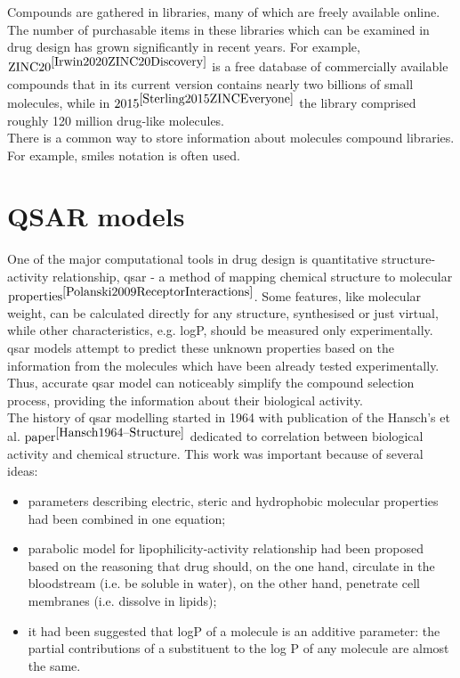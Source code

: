 Compounds are gathered in libraries, many of which are freely available online.
The number of purchasable items in these libraries which can be examined in drug design has grown significantly in recent years.
For example, $\text{ZINC20}^{\cite{Irwin2020ZINC20Discovery}}$ is a free database of commercially available compounds that in its current version contains nearly two billions of small molecules, while in $\text{2015}^{\cite{Sterling2015ZINCEveryone}}$ the library comprised roughly 120 million drug-like molecules.
\hfill\break\\
There is a common way to store information about molecules compound libraries.
For example, \acrshort{smiles} notation is often used.\\

\section{QSAR models}
One of the major computational tools in drug design is quantitative structure-activity relationship, \acrshort{qsar} - a method of mapping chemical structure to molecular $\text{properties}^{\cite{Polanski2009ReceptorInteractions}}$. 
Some features, like molecular weight, can be calculated directly for any structure, synthesised or just virtual, while other characteristics, e.g. logP, should be measured only experimentally.
\acrshort{qsar} models attempt to predict these unknown properties based on the information from the molecules which have been already tested experimentally.
Thus, accurate \acrshort{qsar} model can noticeably simplify the compound selection process, providing the information about their biological activity.\\

The history of \acrshort{qsar} modelling started in 1964 with publication of the Hansch's et al. $\text{paper}^{\cite{Hansch1964--Structure}}$ dedicated to correlation between biological activity and chemical structure.
This work was important because of several ideas:
\begin{itemize}

    \item  parameters describing electric, steric and hydrophobic molecular properties had been combined in one equation;
    \item parabolic model for lipophilicity-activity relationship had been proposed based on the reasoning that drug should, on the one hand, circulate in the bloodstream (i.e. be soluble in water), on the other hand, penetrate cell membranes (i.e. dissolve in lipids); 
    \item it had been suggested that logP of a molecule is an additive parameter: the partial contributions of a substituent to the log P of any molecule are almost the same.
\end{itemize}

